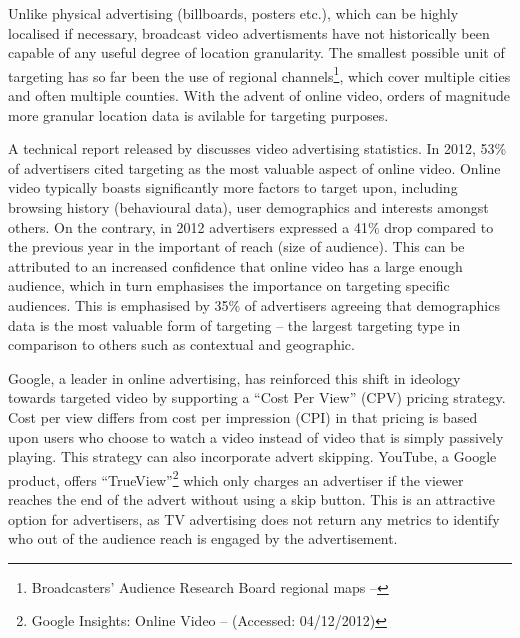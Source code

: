 	Unlike physical advertising (billboards, posters etc.), which can be highly localised if necessary, broadcast video advertisments have not historically been capable of any useful degree of location granularity. The smallest possible unit of targeting has so far been the use of regional channels\footnote{Broadcasters' Audience Research Board regional maps -- }, which cover multiple cities and often multiple counties. With the advent of online video, orders of magnitude more granular location data is avilable for targeting purposes.

	A technical report released by \citet{brightroll-report} discusses video advertising statistics. In 2012, 53\% of advertisers cited targeting as the most valuable aspect of online video. Online video typically boasts significantly more factors to target upon, including browsing history (behavioural data), user demographics and interests amongst others. On the contrary, in 2012 advertisers expressed a 41\% drop compared to the previous year in the important of reach (size of audience). This can be attributed to an increased confidence that online video has a large enough audience, which in turn emphasises the importance on targeting specific audiences. This is emphasised by 35\% of advertisers agreeing that demographics data is the most valuable form of targeting -- the largest targeting type in comparison to others such as contextual and geographic.


	Google, a leader in online advertising, has reinforced this shift in ideology towards targeted video by supporting a ``Cost Per View'' (CPV) pricing strategy. Cost per view differs from cost per impression (CPI) in that pricing is based upon users who choose to watch a video instead of video that is simply passively playing. This strategy can also incorporate advert skipping. YouTube, a Google product, offers ``TrueView''\footnote{Google Insights: Online Video --  (Accessed: 04/12/2012)} which only charges an advertiser if the viewer reaches the end of the advert without using a skip button. This is an attractive option for advertisers, as TV advertising does not return any metrics to identify who out of the audience reach is engaged by the advertisement.

